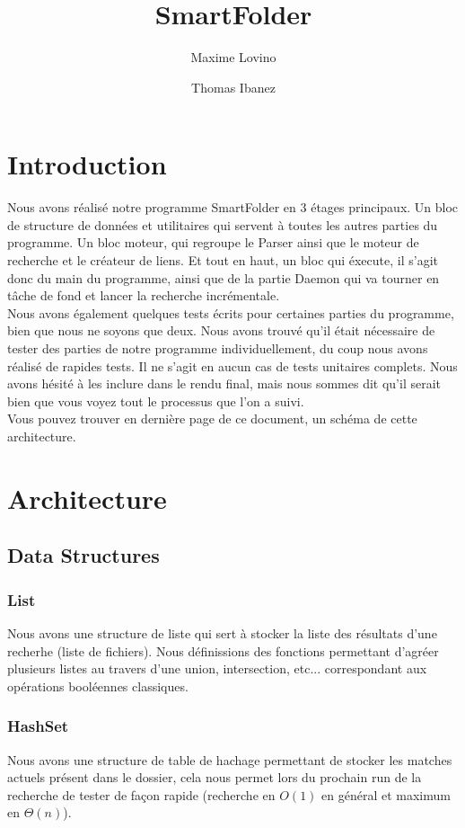 \documentclass[a4paper]{article}
\title{SmartFolder}
\author{Maxime Lovino \and Thomas Ibanez}
\begin{document}
\maketitle
\newpage
\section{Introduction}
Nous avons réalisé notre programme SmartFolder en 3 étages principaux. Un bloc de structure de données et utilitaires qui servent à toutes les autres parties du programme. Un bloc moteur, qui regroupe le Parser ainsi que le moteur de recherche et le créateur de liens. Et tout en haut, un bloc qui éxecute, il s'agit donc du main du programme, ainsi que de la partie Daemon qui va tourner en tâche de fond et lancer la recherche incrémentale. \\

Nous avons également quelques tests écrits pour certaines parties du programme, bien que nous ne soyons que deux. Nous avons trouvé qu'il était nécessaire de tester des parties de notre programme individuellement, du coup nous avons réalisé de rapides tests. Il ne s'agit en aucun cas de tests unitaires complets. Nous avons hésité à les inclure dans le rendu final, mais nous sommes dit qu'il serait bien que vous voyez tout le processus que l'on a suivi. \\

Vous pouvez trouver en dernière page de ce document, un schéma de cette architecture.
\section{Architecture}
\subsection{Data Structures}
\subsubsection{List}
Nous avons une structure de liste qui sert à stocker la liste des résultats d'une recherhe (liste de fichiers). Nous définissions des fonctions permettant d'agréer plusieurs listes au travers d'une union, intersection, etc... correspondant aux opérations booléennes classiques.
\subsubsection{HashSet}
Nous avons une structure de table de hachage permettant de stocker les matches actuels présent dans le dossier, cela nous permet lors du prochain run de la recherche de tester de façon rapide (recherche en $O(1)$ en général et maximum en $\Theta(n)$).
\end{document}

